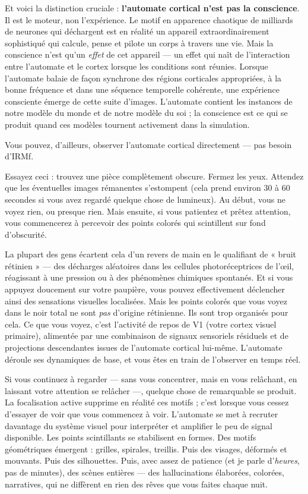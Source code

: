 \documentclass[11pt, twoside, openright]{book}
\begin{document}
Et voici la distinction cruciale : \textbf{l'automate cortical n'est pas la conscience}. Il est le moteur, non l'expérience. Le motif en apparence chaotique de milliards de neurones qui déchargent est en réalité un appareil extraordinairement sophistiqué qui calcule, pense et pilote un corps à travers une vie. Mais la conscience n'est qu'un \textit{effet} de cet appareil --- un effet qui naît de l'interaction entre l'automate et le cortex lorsque les conditions sont réunies. Lorsque l'automate balaie de façon synchrone des régions corticales appropriées, à la bonne fréquence et dans une séquence temporelle cohérente, une expérience consciente émerge de cette suite d'images. L'automate contient les instances de notre modèle du monde et de notre modèle du soi ; la conscience est ce qui se produit quand ces modèles tournent activement dans la simulation.

Vous pouvez, d'ailleurs, observer l'automate cortical directement --- pas besoin d'IRMf.

Essayez ceci : trouvez une pièce complètement obscure. Fermez les yeux. Attendez que les éventuelles images rémanentes s'estompent (cela prend environ 30 à 60 secondes si vous avez regardé quelque chose de lumineux). Au début, vous ne voyez rien, ou presque rien. Mais ensuite, si vous patientez et prêtez attention, vous commencerez à percevoir des points colorés qui scintillent sur fond d'obscurité.

La plupart des gens écartent cela d'un revers de main en le qualifiant de « bruit rétinien » --- des décharges aléatoires dans les cellules photoréceptrices de l'œil, réagissant à une pression ou à des phénomènes chimiques spontanés. Et si vous appuyez doucement sur votre paupière, vous pouvez effectivement déclencher ainsi des sensations visuelles localisées. Mais les points colorés que vous voyez dans le noir total ne sont \textit{pas} d'origine rétinienne. Ils sont trop organisés pour cela. Ce que vous voyez, c'est l'activité de repos de V1 (votre cortex visuel primaire), alimentée par une combinaison de signaux sensoriels résiduels et de projections descendantes issues de l'automate cortical lui-même. L'automate déroule ses dynamiques de base, et vous êtes en train de l'observer en temps réel.

Si vous continuez à regarder --- sans vous concentrer, mais en vous relâchant, en laissant votre attention se relâcher ---, quelque chose de remarquable se produit. La focalisation active supprime en réalité ces motifs ; c'est lorsque vous cessez d'essayer de voir que vous commencez à voir. L'automate se met à recruter davantage du système visuel pour interpréter et amplifier le peu de signal disponible. Les points scintillants se stabilisent en formes. Des motifs géométriques émergent : grilles, spirales, treillis. Puis des visages, déformés et mouvants. Puis des silhouettes. Puis, avec assez de patience (et je parle d'\textit{heures}, pas de minutes), des scènes entières --- des hallucinations élaborées, colorées, narratives, qui ne diffèrent en rien des rêves que vous faites chaque nuit.
\end{document}
